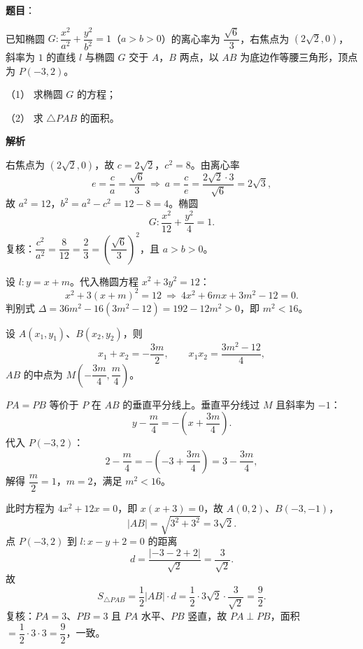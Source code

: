 \begin{answer}

\textbf{题目}：

已知椭圆 $G:\dfrac{x^2}{a^2}+\dfrac{y^2}{b^2}=1$（$a>b>0$）的离心率为 $\dfrac{\sqrt6}{3}$，右焦点为 $(2\sqrt2,0)$，斜率为 $1$ 的直线 $l$ 与椭圆 $G$ 交于 $A$，$B$ 两点，以 $AB$ 为底边作等腰三角形，顶点为 $P(-3,2)$。

（1） 求椭圆 $G$ 的方程；

（2） 求 $\triangle PAB$ 的面积。

\textbf{解析}


右焦点为 $(2\sqrt2,0)$，故 $c=2\sqrt2$，$c^2=8$。由离心率
\nopagebreak[4]
\[
e=\frac ca=\frac{\sqrt6}{3}\ \Longrightarrow\ a=\frac{c}{e}=\frac{2\sqrt2\cdot3}{\sqrt6}=2\sqrt3,
\]
故 $a^2=12$，$b^2=a^2-c^2=12-8=4$。椭圆
\nopagebreak[4]
\[
G:\frac{x^2}{12}+\frac{y^2}{4}=1.
\]
复核：$\dfrac{c^2}{a^2}=\dfrac{8}{12}=\dfrac23=\left(\dfrac{\sqrt6}{3}\right)^2$，且 $a>b>0$。


设 $l:y=x+m$。代入椭圆方程 $x^2+3y^2=12$：
\nopagebreak[4]
\[
x^2+3(x+m)^2=12\ \Longrightarrow\ 4x^2+6mx+3m^2-12=0.
\]
判别式 $\Delta=36m^2-16(3m^2-12)=192-12m^2>0$，即 $m^2<16$。

设 $A(x_1,y_1)$、$B(x_2,y_2)$，则
\nopagebreak[4]
\[
x_1+x_2=-\frac{3m}{2},\qquad x_1x_2=\frac{3m^2-12}{4},
\]
$AB$ 的中点为 $M\left(-\dfrac{3m}{4},\dfrac m4\right)$。

$PA=PB$ 等价于 $P$ 在 $AB$ 的垂直平分线上。垂直平分线过 $M$ 且斜率为 $-1$：
\nopagebreak[4]
\[
y-\frac m4=-\left(x+\frac{3m}{4}\right).
\]
代入 $P(-3,2)$：
\nopagebreak[4]
\[
2-\frac m4=-\left(-3+\frac{3m}{4}\right)=3-\frac{3m}{4},
\]
解得 $\dfrac m2=1$，$m=2$，满足 $m^2<16$。

此时方程为 $4x^2+12x=0$，即 $x(x+3)=0$，故 $A(0,2)$、$B(-3,-1)$，
\nopagebreak[4]
\[
|AB|=\sqrt{3^2+3^2}=3\sqrt2.
\]
点 $P(-3,2)$ 到 $l:x-y+2=0$ 的距离
\nopagebreak[4]
\[
d=\frac{|-3-2+2|}{\sqrt2}=\frac{3}{\sqrt2}.
\]
故
\nopagebreak[4]
\[
S_{\triangle PAB}=\frac12|AB|\cdot d=\frac12\cdot3\sqrt2\cdot\frac{3}{\sqrt2}=\frac92.
\]
复核：$PA=3$、$PB=3$ 且 $PA$ 水平、$PB$ 竖直，故 $PA\perp PB$，面积 $=\dfrac12\cdot3\cdot3=\dfrac92$，一致。



\end{answer}
